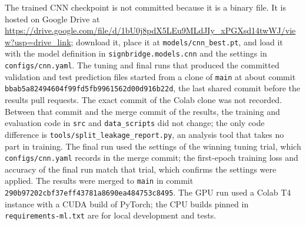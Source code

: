 The trained CNN checkpoint is not committed because it is a binary file. It is hosted on Google Drive at \url{https://drive.google.com/file/d/1bU0j8pdX5LEu9MLdJIy_xPGXsd14twWJ/view?usp=drive_link}; download it, place it at \texttt{models/cnn\_best.pt}, and load it with the model definition in \texttt{signbridge.models.cnn} and the settings in \texttt{configs/cnn.yaml}. The tuning and final runs that produced the committed validation and test prediction files started from a clone of \texttt{main} at about commit \texttt{bbab5a82494604f99fd5fb9961562d00d916b22d}, the last shared commit before the results pull requests. The exact commit of the Colab clone was not recorded. Between that commit and the merge commit of the results, the training and evaluation code in \texttt{src} and \texttt{data\_scripts} did not change; the only code difference is \texttt{tools/split\_leakage\_report.py}, an analysis tool that takes no part in training. The final run used the settings of the winning tuning trial, which \texttt{configs/cnn.yaml} records in the merge commit; the first-epoch training loss and accuracy of the final run match that trial, which confirms the settings were applied. The results were merged to \texttt{main} in commit \texttt{290b97202cbf37eff43781a8690ea484753c8495}. The GPU run used a Colab T4 instance with a CUDA build of PyTorch; the CPU builds pinned in \texttt{requirements-ml.txt} are for local development and tests.
